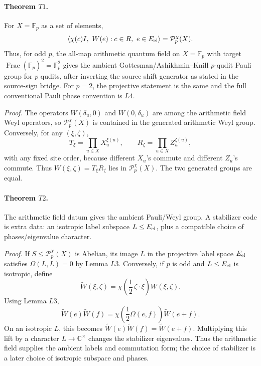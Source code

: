 \paragraph{Theorem \(T1\).}
For \(X=\mathbb F_p\) as a set of elements,
\[
  \langle \chi(c)I,\ W(e):c\in R,\ e\in E_{\rm el}\rangle
  =
  \mathcal P_p^\chi(X).
\]
Thus, for odd \(p\), the all-map arithmetic quantum field on
\(X=\mathbb F_p\) with target
\(\operatorname{Frac}(\mathbb F_p)^2=\mathbb F_p^2\) gives the ambient
Gottesman/Ashikhmin--Knill \(p\)-qudit Pauli group for \(p\) qudits, after
inverting the source shift generator as stated in the source-sign bridge.  For
\(p=2\), the projective statement is the same and the full conventional Pauli
phase convention is \(L4\).

\emph{Proof.}
The operators \(W(\delta_u,0)\) and \(W(0,\delta_u)\) are among the arithmetic
field Weyl operators, so \(\mathcal P_p^\chi(X)\) is contained in the generated
arithmetic Weyl group.  Conversely, for any \((\xi,\zeta)\),
\[
  T_\xi=\prod_{u\in X}X_u^{\xi(u)},\qquad
  R_\zeta=\prod_{u\in X}Z_u^{\zeta(u)},
\]
with any fixed site order, because different \(X_u\)'s commute and different
\(Z_u\)'s commute.  Thus \(W(\xi,\zeta)=T_\xi R_\zeta\) lies in
\(\mathcal P_p^\chi(X)\).  The two generated groups are equal.

\paragraph{Theorem \(T2\).}
The arithmetic field datum gives the ambient Pauli/Weyl group.  A stabilizer
code is extra data: an isotropic label subspace \(L\leq E_{\rm el}\), plus a
compatible choice of phases/eigenvalue character.

\emph{Proof.}
If \(S\leq\mathcal P_p^\chi(X)\) is Abelian, its image \(L\) in the projective label
space \(E_{\rm el}\) satisfies \(\Omega(L,L)=0\) by Lemma \(L3\).  Conversely,
if \(p\) is odd and \(L\leq E_{\rm el}\) is isotropic, define
\[
  \widetilde W(\xi,\zeta)=
  \chi\!\left(\frac12\,\zeta\cdot\xi\right)W(\xi,\zeta).
\]
Using Lemma \(L3\),
\[
  \widetilde W(e)\widetilde W(f)
  =
  \chi\!\left(\frac12\Omega(e,f)\right)\widetilde W(e+f).
\]
On an isotropic \(L\), this becomes
\(\widetilde W(e)\widetilde W(f)=\widetilde W(e+f)\).  Multiplying this lift by
a character \(L\to\mathbb C^\times\) changes the stabilizer eigenvalues.  Thus
the arithmetic field supplies the ambient labels and commutation form; the
choice of stabilizer is a later choice of isotropic subspace and phases.

